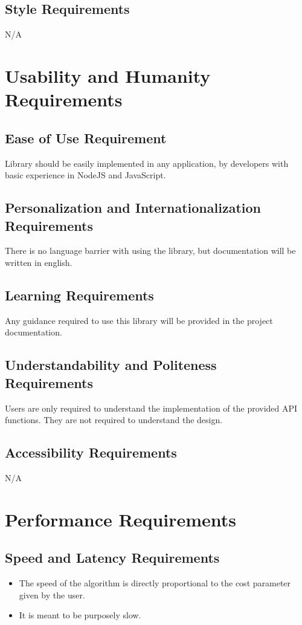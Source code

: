 \documentclass[12pt]{article}
\begin{document}
\subsection {Style Requirements}
N/A

\section {Usability and Humanity Requirements}

\subsection {Ease of Use Requirement}
Library should be easily implemented in any application, by developers with basic experience in NodeJS and JavaScript.

\subsection {Personalization and Internationalization Requirements}
There is no language barrier with using the library, but documentation will be written in english.

\subsection {Learning Requirements}
Any guidance required to use this library will be provided in the project documentation.

\subsection {Understandability and Politeness Requirements}
Users are only required to understand the implementation of the provided API functions. They are not required to understand the design.

\subsection {Accessibility Requirements}
N/A

\section {Performance Requirements}

\subsection {Speed and Latency Requirements}
\begin{itemize}
	\item The speed of the algorithm is directly proportional to the cost parameter given by the user.
	\item It is meant to be purposely slow.
\end{itemize}
\end{document}
